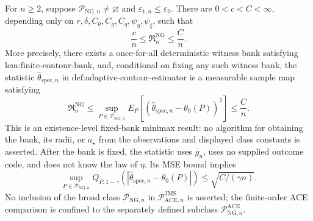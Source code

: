 For \(n\ge2\), suppose \(\mathcal P_{\mathrm{NG},n}\neq\varnothing\) and \(\varepsilon_{1,n}\le\varepsilon_0\). There are \(0<c<C<\infty\), depending only on \(r,\delta,C_{\theta},C_g,C_q,\psi_{\eta},\psi_{\xi}\), such that
\[
 \frac cn\le\mathfrak R_n^{\mathrm{NG}}\le\frac Cn.
\]
More precisely, there exists a once-for-all deterministic witness bank satisfying \(\text{lem:finite-contour-bank}\), and, conditional on fixing any such witness bank, the statistic \(\widehat\theta_{\mathrm{spec},n}\) in \(\text{def:adaptive-contour-estimator}\) is a measurable sample map satisfying
\[
 \mathfrak R_n^{\mathrm{NG}}
 \le\sup_{P\in\mathcal P_{\mathrm{NG},n}}
 E_P[(\widehat\theta_{\mathrm{spec},n}-\theta_0(P))^2]
 \le\frac Cn.
\]
This is an existence-level fixed-bank minimax result: no algorithm for obtaining the bank, its radii, or \(a_{\star}\) from the observations and displayed class constants is asserted. After the bank is fixed, the statistic uses \(\bar g_n\), uses no supplied outcome code, and does not know the law of \(\eta\). Its MSE bound implies
\[
 \sup_{P\in\mathcal P_{\mathrm{NG},n}}
 Q_{P,1-\gamma}(|\widehat\theta_{\mathrm{spec},n}-\theta_0(P)|)
 \le\sqrt{C/(\gamma n)}.
\]
No inclusion of the broad class \(\mathcal P_{\mathrm{NG},n}\) in \(\mathcal P_{\mathrm{ACE},n}^{\mathrm{JMS}}\) is asserted; the finite-order ACE comparison is confined to the separately defined subclass \(\mathcal P_{\mathrm{NG},n}^{\mathrm{ACE}}\).